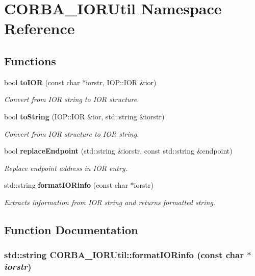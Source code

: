 \section{CORBA\_\-IORUtil Namespace Reference}
\label{namespaceCORBA__IORUtil}
\subsection*{Functions}
\begin{DoxyCompactItemize}
\item 
bool {\bf toIOR} (const char $\ast$iorstr, IOP::IOR \&ior)
\begin{DoxyCompactList}\small\item\em Convert from IOR string to IOR structure. \item\end{DoxyCompactList}\item 
bool {\bf toString} (IOP::IOR \&ior, std::string \&iorstr)
\begin{DoxyCompactList}\small\item\em Convert from IOR structure to IOR string. \item\end{DoxyCompactList}\item 
bool {\bf replaceEndpoint} (std::string \&iorstr, const std::string \&endpoint)
\begin{DoxyCompactList}\small\item\em Replace endpoint address in IOR entry. \item\end{DoxyCompactList}\item 
std::string {\bf formatIORinfo} (const char $\ast$iorstr)
\begin{DoxyCompactList}\small\item\em Extracts information from IOR string and returns formatted string. \item\end{DoxyCompactList}\end{DoxyCompactItemize}


\subsection{Function Documentation}
\subsubsection[{formatIORinfo}]{\setlength{\rightskip}{0pt plus 5cm}std::string CORBA\_\-IORUtil::formatIORinfo (const char $\ast$ {\em iorstr})}\label{namespaceCORBA__IORUtil_a9e4dfff4103d028b8958ab7ef15c83d5}


